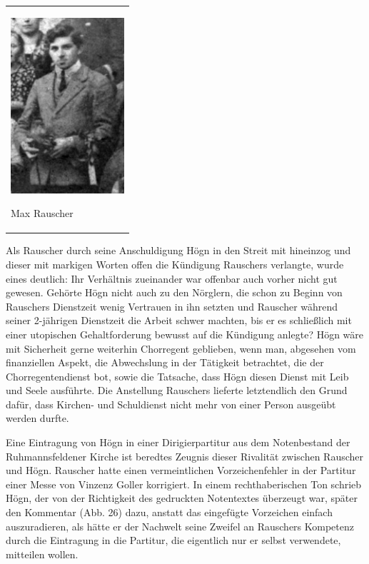 \begin{center}
\begin{minipage}{4.591cm}
\begin{center}
\tablefirsthead{}
\tablehead{}
\tabletail{}
\tablelasttail{}
\begin{supertabular}{m{4.3910003cm}}

\includegraphics[width=4.209cm,height=6.507cm]{pictures/zulassungsarbeit-img027.jpg}

Max Rauscher\\
\end{supertabular}
\end{center}
\end{minipage}
\end{center}
Als Rauscher durch seine Anschuldigung Högn in den Streit mit hineinzog
und dieser mit markigen Worten offen die Kündigung Rauschers verlangte,
wurde eines deutlich: Ihr Verhältnis zueinander war offenbar auch
vorher nicht gut gewesen. Gehörte Högn nicht auch zu den Nörglern, die
schon zu Beginn von Rauschers Dienstzeit wenig Vertrauen in ihn setzten
und Rauscher während seiner 2-jährigen Dienstzeit die Arbeit schwer
machten, bis er es schließlich mit einer utopischen Gehaltforderung
bewusst auf die Kündigung anlegte? Högn wäre mit Sicherheit gerne
weiterhin Chorregent geblieben, wenn man, abgesehen vom finanziellen
Aspekt, die Abwechslung in der Tätigkeit betrachtet, die der
Chorregentendienst bot, sowie die Tatsache, dass Högn diesen Dienst mit
Leib und Seele ausführte. Die Anstellung Rauschers lieferte
letztendlich den Grund dafür, dass Kirchen- und Schuldienst nicht mehr
von einer Person ausgeübt werden durfte.

Eine Eintragung von Högn in einer Dirigierpartitur aus dem Notenbestand
der Ruhmannsfeldener Kirche ist beredtes Zeugnis dieser Rivalität
zwischen Rauscher und Högn. Rauscher hatte einen vermeintlichen
Vorzeichenfehler in der Partitur einer Messe von Vinzenz Goller
korrigiert. In einem rechthaberischen Ton schrieb Högn, der von der
Richtigkeit des gedruckten Notentextes überzeugt war, später den
Kommentar (Abb. 26) dazu, anstatt das eingefügte Vorzeichen einfach
auszuradieren, als hätte er der Nachwelt seine Zweifel an Rauschers
Kompetenz durch die Eintragung in die Partitur, die eigentlich nur er
selbst verwendete, mitteilen wollen.

